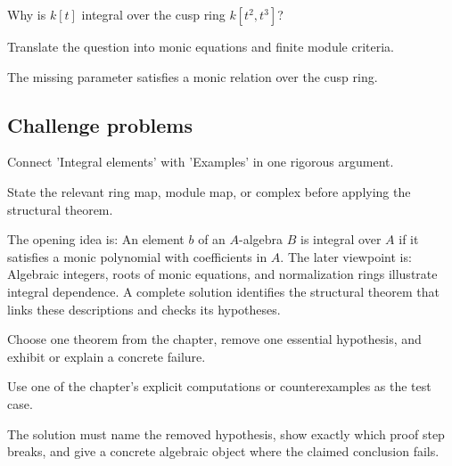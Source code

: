 \begin{exercise}\label{exr:v19-expand-14}
Why is $k[t]$ integral over the cusp ring $k[t^2,t^3]$?
\end{exercise}
\begin{hint}
Translate the question into monic equations and finite module criteria.
\end{hint}
\begin{solution}
The missing parameter satisfies a monic relation over the cusp ring.
\end{solution}

\subsection*{Challenge problems}

\begin{exercise}\label{exr:v19-expand-15}
Connect 'Integral elements' with 'Examples' in one rigorous argument.
\end{exercise}
\begin{hint}
State the relevant ring map, module map, or complex before applying the structural theorem.
\end{hint}
\begin{solution}
The opening idea is: An element $b$ of an $A$-algebra $B$ is integral over $A$ if it satisfies a monic polynomial with coefficients in $A$. The later viewpoint is: Algebraic integers, roots of monic equations, and normalization rings illustrate integral dependence. A complete solution identifies the structural theorem that links these descriptions and checks its hypotheses.
\end{solution}

\begin{exercise}\label{exr:v19-expand-16}
Choose one theorem from the chapter, remove one essential hypothesis, and exhibit or explain a concrete failure.
\end{exercise}
\begin{hint}
Use one of the chapter's explicit computations or counterexamples as the test case.
\end{hint}
\begin{solution}
The solution must name the removed hypothesis, show exactly which proof step breaks, and give a concrete algebraic object where the claimed conclusion fails.
\end{solution}

